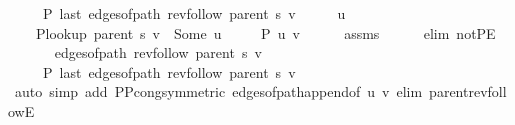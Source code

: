 \begin{isabellebody}
\ \ \ \ {\isachardoublequoteopen}{\isasymnot}\ P{\isacharprime}{\kern0pt}{\isacharprime}{\kern0pt}\ {\isacharparenleft}{\kern0pt}last\ {\isacharparenleft}{\kern0pt}edges{\isacharunderscore}{\kern0pt}of{\isacharunderscore}{\kern0pt}path\ {\isacharparenleft}{\kern0pt}rev{\isacharunderscore}{\kern0pt}follow\ {\isacharparenleft}{\kern0pt}parent\ s{\isacharparenright}{\kern0pt}\ v{\isacharparenright}{\kern0pt}{\isacharparenright}{\kern0pt}{\isacharparenright}{\kern0pt}{\isachardoublequoteclose}%
\endisataginvisible
{\isafoldinvisible}%
%
\isadeliminvisible
\isanewline
%
\endisadeliminvisible
%
\isadelimproof
%
\endisadelimproof
%
\isatagproof
{}\isamarkupfalse%
\ {\isacharminus}{\kern0pt}\isanewline
\ \ \isamarkupfalse%
\ u\ \isanewline
\ \ \ \ {\isachardoublequoteopen}P{\isacharunderscore}{\kern0pt}lookup\ {\isacharparenleft}{\kern0pt}parent\ s{\isacharparenright}{\kern0pt}\ v\ {\isacharequal}{\kern0pt}\ Some\ u{\isachardoublequoteclose}\isanewline
\ \ \ \ {\isachardoublequoteopen}{\isasymnot}\ P{\isacharprime}{\kern0pt}{\isacharprime}{\kern0pt}\ {\isacharbraceleft}{\kern0pt}u{\isacharcomma}{\kern0pt}\ v{\isacharbraceright}{\kern0pt}{\isachardoublequoteclose}\isanewline
\ \ \ \ \isamarkupfalse%
\ assms\isanewline
\ \ \ \ \isamarkupfalse%
\ {\isacharparenleft}{\kern0pt}elim\ not{\isacharunderscore}{\kern0pt}P{\isacharprime}{\kern0pt}E{\isacharparenright}{\kern0pt}\isanewline
\ \ \isamarkupfalse%
\isanewline
\ \ \ \ {\isachardoublequoteopen}edges{\isacharunderscore}{\kern0pt}of{\isacharunderscore}{\kern0pt}path\ {\isacharparenleft}{\kern0pt}rev{\isacharunderscore}{\kern0pt}follow\ {\isacharparenleft}{\kern0pt}parent\ s{\isacharparenright}{\kern0pt}\ v{\isacharparenright}{\kern0pt}\ {\isasymnoteq}\ {\isacharbrackleft}{\kern0pt}{\isacharbrackright}{\kern0pt}{\isachardoublequoteclose}\isanewline
\ \ \ \ {\isachardoublequoteopen}{\isasymnot}\ P{\isacharprime}{\kern0pt}{\isacharprime}{\kern0pt}\ {\isacharparenleft}{\kern0pt}last\ {\isacharparenleft}{\kern0pt}edges{\isacharunderscore}{\kern0pt}of{\isacharunderscore}{\kern0pt}path\ {\isacharparenleft}{\kern0pt}rev{\isacharunderscore}{\kern0pt}follow\ {\isacharparenleft}{\kern0pt}parent\ s{\isacharparenright}{\kern0pt}\ v{\isacharparenright}{\kern0pt}{\isacharparenright}{\kern0pt}{\isacharparenright}{\kern0pt}{\isachardoublequoteclose}\isanewline
\ \ \ \ \isamarkupfalse%
\ {\isacharparenleft}{\kern0pt}auto\ simp\ add{\isacharcolon}{\kern0pt}\ P{\isacharunderscore}{\kern0pt}P{\isacharprime}{\kern0pt}{\isacharprime}{\kern0pt}{\isacharunderscore}{\kern0pt}cong{\isacharbrackleft}{\kern0pt}symmetric{\isacharbrackright}{\kern0pt}\ edges{\isacharunderscore}{\kern0pt}of{\isacharunderscore}{\kern0pt}path{\isacharunderscore}{\kern0pt}append{\isacharunderscore}{\kern0pt}{}{\isacharbrackleft}{\kern0pt}of\ {\isachardoublequoteopen}{\isacharbrackleft}{\kern0pt}u{\isacharcomma}{\kern0pt}\ v{\isacharbrackright}{\kern0pt}{\isachardoublequoteclose}{\isacharbrackright}{\kern0pt}\ elim{\isacharcolon}{\kern0pt}\ parent{\isacharunderscore}{\kern0pt}rev{\isacharunderscore}{\kern0pt}followE{\isacharparenright}{\kern0pt}\isanewline

\end{isabellebody}
